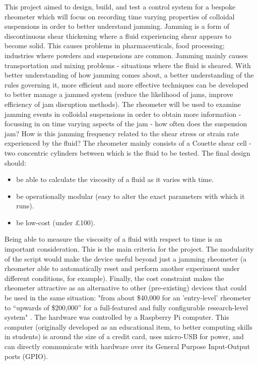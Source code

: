 \documentclass[twoside,a4]{report}
\def\br{\newline \newline \noindent}
\begin{document}
	This project aimed to design, build, and test a control system for a bespoke rheometer which will focus on recording time varying properties of colloidal suspensions in order to better understand jamming. Jamming is a form of discontinuous shear thickening where a fluid experiencing shear appears to become solid. This causes problems in pharmaceuticals, food processing; industries where powders and suspensions are common. Jamming mainly causes transportation and mixing problems - situations where the fluid is sheared. With better understanding of how jamming comes about, a better understanding of the rules governing it, more efficient and more effective techniques can be developed to better manage a jammed system (reduce the likelihood of jams, improve efficiency of jam disruption methods).
	\br
	The rheometer will be used to examine jamming events in colloidal suspensions in order to obtain more information - focussing in on time varying aspects of the jam - how often does the suspension jam? How is this jamming frequency related to the shear stress or strain rate experienced by the fluid? The rheometer mainly consists of a Couette shear cell - two concentric cylinders between which is the fluid to be tested. The final design should:
	\begin{itemize}
		\item be able to calculate the viscosity of a fluid as it varies with time.
		\item be operationally modular (easy to alter the exact parameters with which it runs).
		\item be low-cost (under \pounds 100).
	\end{itemize}
	Being able to measure the viscosity of a fluid with respect to time is an important consideration. This is the main criteria for the project. The modularity of the script would make the device useful beyond just a jamming rheometer (a rheometer able to automatically reset and perform another experiment under different conditions, for example). Finally, the cost constraint makes the rheometer attractive as an alternative to other (pre-existing) devices that could be used in the same situation: "from about \$40,000 for an 'entry-level' rheometer to “upwards of \$200,000” for a full-featured and fully configurable research-level system" \cite{refrheomprice}.
	\br
	The hardware was controlled by a Raspberry Pi computer. This computer (originally developed as an educational item, to better computing skills in students) is around the size of a credit card, uses micro-USB for power, and can directly communicate with hardware over its General Purpose Input-Output ports (GPIO).
\end{document}
